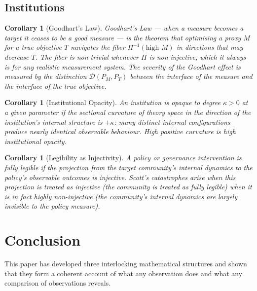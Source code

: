 \documentclass[12pt,a4paper]{article}
\newtheorem{corollary}[theorem]{Corollary}
\theoremstyle{remark}
\theoremstyle{definition}
\begin{document}
\subsection{Institutions}

\begin{corollary}[Goodhart's Law]
Goodhart's Law --- when a measure becomes a target it ceases to be a
good measure --- is the theorem that optimising a proxy $M$ for a true
objective $T$ navigates the fiber $\Pi^{-1}(\text{high } M)$ in
directions that may decrease $T$. The fiber is non-trivial whenever
$\Pi$ is non-injective, which it always is for any realistic measurement
system. The severity of the Goodhart effect is measured by the
distinction $\mathcal{D}(P_M, P_T)$ between the interface of the measure
and the interface of the true objective.
\end{corollary}

\begin{corollary}[Institutional Opacity]
An institution is opaque to degree $\kappa > 0$ at a given parameter if
the sectional curvature of theory space in the direction of the
institution's internal structure is $+\kappa$: many distinct internal
configurations produce nearly identical observable behaviour. High
positive curvature is high institutional opacity.
\end{corollary}

\begin{corollary}[Legibility as Injectivity]
A policy or governance intervention is fully legible if the projection
from the target community's internal dynamics to the policy's observable
outcomes is injective. Scott's catastrophes arise when this projection
is treated as injective (the community is treated as fully legible)
when it is in fact highly non-injective (the community's internal
dynamics are largely invisible to the policy measure).
\end{corollary}


\section*{Conclusion}

This paper has developed three interlocking mathematical structures and
shown that they form a coherent account of what any observation does and
what any comparison of observations reveals.
\end{document}
